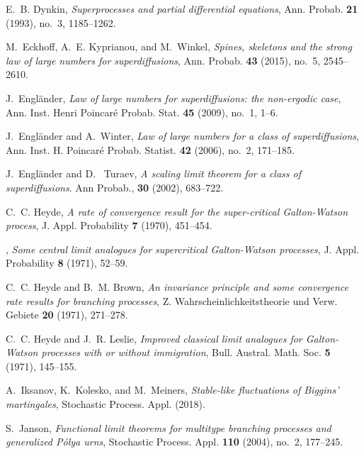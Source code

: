 \documentclass[12pt,a4paper]{amsart}
\theoremstyle{plain}
\theoremstyle{definition}
\numberwithin{equation}{section}
\begin{document}
\begin{thebibliography}{10}
E.~B. Dynkin, \emph{Superprocesses and partial differential equations}, Ann.
  Probab. \textbf{21} (1993), no.~3, 1185--1262.

M.~Eckhoff, A.~E. Kyprianou, and M.~Winkel, \emph{Spines, skeletons and the
  strong law of large numbers for superdiffusions}, Ann. Probab. \textbf{43}
  (2015), no.~5, 2545--2610.

J.~Engl\"{a}nder, \emph{Law of large numbers for superdiffusions: the
  non-ergodic case}, Ann. Inst. Henri Poincar\'{e} Probab. Stat. \textbf{45}
  (2009), no.~1, 1--6.


J.~Engl\"{a}nder and A.~Winter, \emph{Law of large numbers for a class of
  superdiffusions}, Ann. Inst. H. Poincar\'{e} Probab. Statist. \textbf{42}
  (2006), no.~2, 171--185.

J.~Engl\"{a}nder and  D. ~Turaev, \emph{A scaling limit theorem for a class of superdiffusions}. Ann Probab., \textbf{30} (2002),  683--722.


C.~C. Heyde, \emph{A rate of convergence result for the super-critical
  {G}alton-{W}atson process}, J. Appl. Probability \textbf{7} (1970), 451--454.

\bysame, \emph{Some central limit analogues for supercritical {G}alton-{W}atson
  processes}, J. Appl. Probability \textbf{8} (1971), 52--59.

C.~C. Heyde and B.~M. Brown, \emph{An invariance principle and some convergence
  rate results for branching processes}, Z. Wahrscheinlichkeitstheorie und
  Verw. Gebiete \textbf{20} (1971), 271--278.

C.~C. Heyde and J.~R. Leslie, \emph{Improved classical limit analogues for
  {G}alton-{W}atson processes with or without immigration}, Bull. Austral.
  Math. Soc. \textbf{5} (1971), 145--155.



A.~Iksanov, K.~Kolesko, and M.~Meiners, \emph{Stable-like fluctuations of {B}iggins' martingales}, Stochastic
  Process. Appl. (2018).

S.~Janson, \emph{Functional limit theorems for multitype branching processes
  and generalized {P}\'{o}lya urns}, Stochastic Process. Appl. \textbf{110}
  (2004), no.~2, 177--245.


\end{thebibliography}
\end{document}
